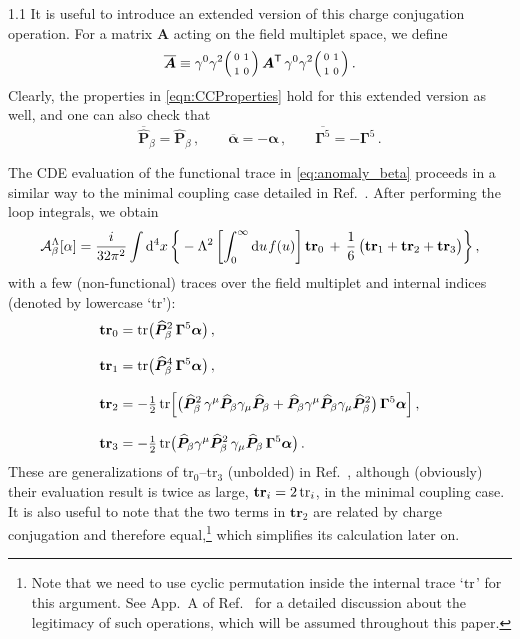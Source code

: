 \documentclass[a4paper,12pt]{article}
\def\Acal{{\cal A}}
\def\mat#1{\boldsymbol{#1}}
\def\T{\textsf{T}}
\def\X{\mat{\widehat{P}}}
\def\G5{\mat{\Gamma}^5}
\def\alphamat{\mat{\alpha}}
\def\btr{\mathbf{tr}}
\newcommand{\s}{\hspace{0.8pt}}
\begin{document}
\begin{spacing}{1.1}
It is useful to introduce an extended version of this charge conjugation operation. For a matrix $\mat{A}$ acting on the field multiplet space, we define 
\begin{equation}
\overline{\mat{A}} \equiv
\gamma^0\gamma^2 
\Bigl(\begin{smallmatrix}
0 & 1 \\[4pt] 1 & 0
\end{smallmatrix}\Bigr) \,
\mat{A}^\T \,
\gamma^0\gamma^2 
\Bigl(\begin{smallmatrix}
0 & 1 \\[4pt] 1 & 0
\end{smallmatrix}\Bigr) \,.
\label{eqn:CCdef}
\end{equation}
Clearly, the properties in \cref{eqn:CCProperties} hold for this extended version as well, and one can also check that
\begin{equation}
\overline{\X}_\beta = \X_\beta \,,\qquad
\overline{\alphamat} = -\alphamat \,, \qquad
\overline{\G5} = -\G5 \,.
\end{equation}

The CDE evaluation of the functional trace in \cref{eq:anomaly_beta} proceeds in a similar way to the minimal coupling case detailed in Ref.~\cite{Paper1}. After performing the loop integrals, we obtain
\begin{equation}
\Acal_\beta^\Lambda [\alpha] = \frac{i}{32\pi^2} \int \dd^4x\, \bigg\{
-\Lambda^2 \left[ \int_0^\infty \dd u\s f(u) \right] \btr_0\, +\, \frac16\, \bigl(\btr_1+\btr_2 +\btr_3\bigr)
\bigg\} \,,
\end{equation}
with a few (non-functional) traces over the field multiplet and internal indices (denoted by lowercase `tr'):
\begin{subequations}\label{eq:tr}
\begin{align}
\btr_0 &= \tr \bigl( \X_\beta^2 \, \G5 \alphamat \bigr) \,, \\[8pt]
\btr_1 &= \tr \bigl( \X_\beta^4 \, \G5 \alphamat \bigr) \,, \\[8pt]
\btr_2 &= -\tfrac12 \tr \Bigl[ \bigl(\X_\beta^2\,\gamma^\mu\X_\beta\gamma_\mu \X_\beta + \X_\beta \gamma^\mu\X_\beta\gamma_\mu \X_\beta^2 \bigr) \, \G5 \alphamat \Bigr] 
\,,\\[8pt]
\btr_3 &= -\tfrac12 \tr \bigl( \X_\beta \gamma^\mu\X_\beta^2 \,\gamma_\mu \X_\beta \, \G5 \alphamat \bigr) \,.
\end{align}
\end{subequations}
These are generalizations of tr$_0$--tr$_3$ (unbolded) in Ref.~\cite{Paper1}, although (obviously) their evaluation result is twice as large, $\btr_i = 2\tr_i$,  in the minimal coupling case. It is also useful to note that the two terms in $\btr_2$ are related by charge conjugation and therefore equal,\footnote{Note that we need to use cyclic permutation inside the internal trace `$\tr$' for this argument. See App.~A of Ref.~\cite{Paper1} for a detailed discussion about the legitimacy of such operations, which will be assumed throughout this paper.} which simplifies its calculation later on.




\end{spacing}
\end{document}
